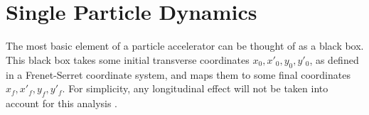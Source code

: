 \chapter{Single Particle Dynamics}
The most basic element of a particle accelerator can be thought of as a black box. This black box takes some initial transverse coordinates $x_0,x'_0,y_0,y'_0$, as defined in a Frenet-Serret coordinate system, and maps them to some final coordinates $x_f,x'_f,y_f,y'_f$. For simplicity, any longitudinal effect will not be taken into account for this analysis \cite{rr1} \cite{rr2} \cite{wolski} \cite{pipII1}.    
